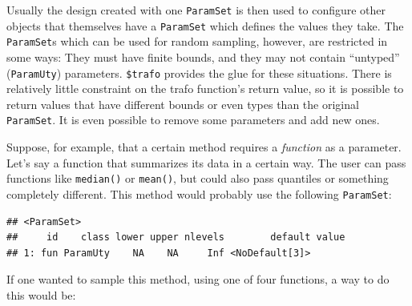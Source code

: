 \documentclass[
]{scrbook}
\newenvironment{Shaded}{\begin{snugshade}}{\end{snugshade}}
\newcommand{\AttributeTok}[1]{\textcolor[rgb]{0.77,0.63,0.00}{#1}}
\newcommand{\ControlFlowTok}[1]{\textcolor[rgb]{0.13,0.29,0.53}{\textbf{#1}}}
\newcommand{\DecValTok}[1]{\textcolor[rgb]{0.00,0.00,0.81}{#1}}
\newcommand{\FunctionTok}[1]{\textcolor[rgb]{0.00,0.00,0.00}{#1}}
\newcommand{\NormalTok}[1]{#1}
\newcommand{\OtherTok}[1]{\textcolor[rgb]{0.56,0.35,0.01}{#1}}
\newcommand{\SpecialCharTok}[1]{\textcolor[rgb]{0.00,0.00,0.00}{#1}}
\newcommand{\StringTok}[1]{\textcolor[rgb]{0.31,0.60,0.02}{#1}}
\renewenvironment{Shaded} {\begin{snugshade}\small} {\end{snugshade}}
\begin{document}
Usually the design created with one \texttt{ParamSet} is then used to configure other objects that themselves have a \texttt{ParamSet} which defines the values they take.
The \texttt{ParamSet}s which can be used for random sampling, however, are restricted in some ways:
They must have finite bounds, and they may not contain ``untyped'' (\texttt{ParamUty}) parameters.
\texttt{\$trafo} provides the glue for these situations.
There is relatively little constraint on the trafo function's return value, so it is possible to return values that have different bounds or even types than the original \texttt{ParamSet}.
It is even possible to remove some parameters and add new ones.

Suppose, for example, that a certain method requires a \emph{function} as a parameter.
Let's say a function that summarizes its data in a certain way.
The user can pass functions like \texttt{median()} or \texttt{mean()}, but could also pass quantiles or something completely different.
This method would probably use the following \texttt{ParamSet}:

\begin{Shaded}
\end{Shaded}

\begin{verbatim}
## <ParamSet>
##     id    class lower upper nlevels        default value
## 1: fun ParamUty    NA    NA     Inf <NoDefault[3]>
\end{verbatim}

If one wanted to sample this method, using one of four functions, a way to do this would be:
\end{document}

